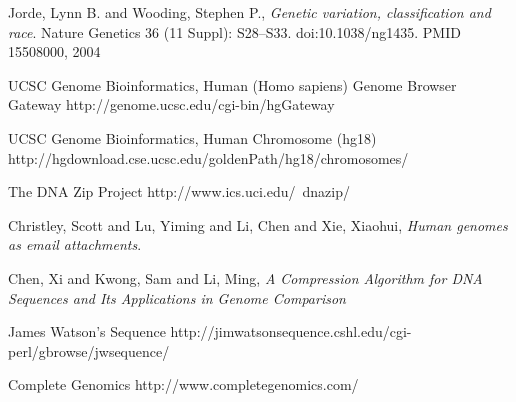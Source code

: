 \documentclass{article}
\begin{document}
\clearpage

\begin{thebibliography}{}

  Jorde, Lynn B. and Wooding, Stephen P.,
  \emph{Genetic variation, classification and race}.
  Nature Genetics 36 (11 Suppl): S28–S33. doi:10.1038/ng1435. PMID 15508000,
  2004

  UCSC Genome Bioinformatics, Human (Homo sapiens) Genome Browser Gateway
  http://genome.ucsc.edu/cgi-bin/hgGateway

  UCSC Genome Bioinformatics, Human Chromosome (hg18)
  http://hgdownload.cse.ucsc.edu/goldenPath/hg18/chromosomes/

  The DNA Zip Project
  http://www.ics.uci.edu/~dnazip/

  Christley, Scott and Lu, Yiming and Li, Chen and Xie, Xiaohui,
  \emph{Human genomes as email attachments}.

  Chen, Xi and Kwong, Sam and Li, Ming,
  \emph{A Compression Algorithm for DNA Sequences and Its Applications in Genome Comparison}
 
  James Watson's Sequence
  http://jimwatsonsequence.cshl.edu/cgi-perl/gbrowse/jwsequence/

  Complete Genomics
  http://www.completegenomics.com/ 
\end{thebibliography}
\end{document}
